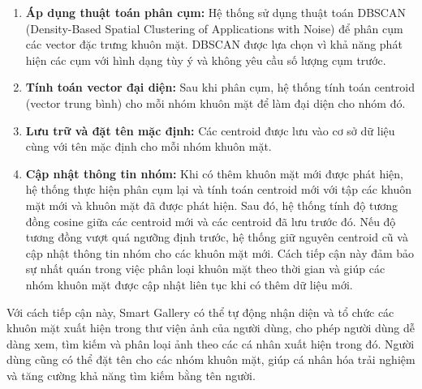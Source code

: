 \begin{enumerate}
    \item \textbf{Áp dụng thuật toán phân cụm:} Hệ thống sử dụng thuật toán DBSCAN (Density-Based Spatial Clustering of Applications with Noise)\cite{dbscan} để phân cụm các vector đặc trưng khuôn mặt. DBSCAN được lựa chọn vì khả năng phát hiện các cụm với hình dạng tùy ý và không yêu cầu số lượng cụm trước.
    
    \item \textbf{Tính toán vector đại diện:} Sau khi phân cụm, hệ thống tính toán centroid (vector trung bình) cho mỗi nhóm khuôn mặt để làm đại diện cho nhóm đó.
    
    \item \textbf{Lưu trữ và đặt tên mặc định:} Các centroid được lưu vào cơ sở dữ liệu cùng với tên mặc định cho mỗi nhóm khuôn mặt.
    
    \item \textbf{Cập nhật thông tin nhóm:} Khi có thêm khuôn mặt mới được phát hiện, hệ thống thực hiện phân cụm lại và tính toán centroid mới với tập các khuôn mặt mới và khuôn mặt đã được phát hiện. Sau đó, hệ thống tính độ tương đồng cosine\cite{cosine} giữa các centroid mới và các centroid đã lưu trước đó. Nếu độ tương đồng vượt quá ngưỡng định trước, hệ thống giữ nguyên centroid cũ và cập nhật thông tin nhóm cho các khuôn mặt mới. Cách tiếp cận này đảm bảo sự nhất quán trong việc phân loại khuôn mặt theo thời gian và giúp các nhóm khuôn mặt được cập nhật liên tục khi có thêm dữ liệu mới. 
\end{enumerate}

Với cách tiếp cận này, Smart Gallery có thể tự động nhận diện và tổ chức các khuôn mặt xuất hiện trong thư viện ảnh của người dùng, cho phép người dùng dễ dàng xem, tìm kiếm và phân loại ảnh theo các cá nhân xuất hiện trong đó. Người dùng cũng có thể đặt tên cho các nhóm khuôn mặt, giúp cá nhân hóa trải nghiệm và tăng cường khả năng tìm kiếm bằng tên người.

